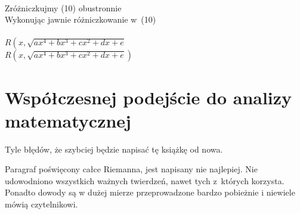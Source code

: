 \documentclass[a4paper,11pt]{article}
\begin{document}
\vspace{\spaceTwo}


 \\
\Jest  Zróżniczkujmy (10) obustronnie \\
\Powin Wykonując jawnie różniczkowanie w~(10) \\
 \\
\Jest  $R\left( x, \sqrt{ a x^{ 4 } + b x^{ 3 } + c x^{ 2 } + d x + e }
\right.$ \\
\Powin $R\left( x, \sqrt{ a x^{ 4 } + b x^{ 3 } + c x^{ 2 } + d x + e }
\right)$ \\












\newpage

\section{Współczesnej podejście do analizy matematycznej}

\vspace{\spaceTwo}




\vspace{0em}



\vspace{0em}


\noindent
Tyle błędów, że szybciej będzie napisać tę książkę od nowa.

\vspace{\spaceFour}





\noindent
Paragraf poświęcony całce Riemanna, jest napisany nie
najlepiej. Nie udowodniono wszystkich ważnych twierdzeń, nawet tych
z~których korzysta. Ponadto dowody są w dużej mierze przeprowadzone
bardzo pobieżnie i niewiele mówią czytelnikowi.

\vspace{\spaceFour}
\end{document}
